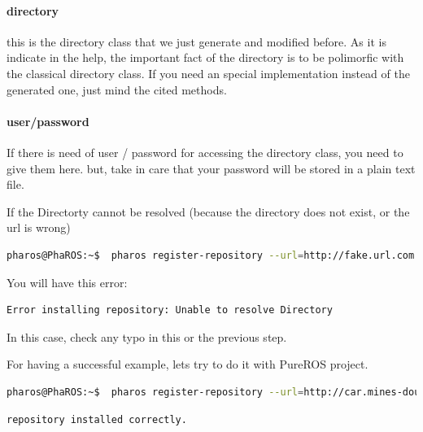 \documentclass[a4paper,10pt,twoside]{book}
\begin{document}
					\paragraph{directory} this is the directory class that we just generate and modified before.  As it is indicate in the help, the important fact of the directory is to be polimorfic with the classical directory class. If you need an special implementation instead of the generated one, just mind the cited methods.
					
					\paragraph{user/password} If there is need of user / password for accessing the directory class, you need to give them here. 
					but, take in care that your password will be stored in a plain text file. 
					
					
					
					If the Directorty cannot be resolved (because the directory does not exist, or the url is wrong) 
					
					\begin{lstlisting}[language=bash,title={ Repository registration }]
						pharos@PhaROS:~$  pharos register-repository --url=http://fake.url.com --package=Directory
					\end{lstlisting} 
					
					You will have this error: 
					
					\begin{lstlisting}[language=bash,title={ Repository registration }]
						Error installing repository: Unable to resolve Directory
					\end{lstlisting} 
					
					In this case, check any typo in this or the previous step.
					
					
					For having a successful example, lets try to do it with PureROS project. 
					
					\begin{lstlisting}[language=bash,title={ Repository registration }]
					pharos@PhaROS:~$  pharos register-repository --url=http://car.mines-douai.fr/squeaksource/Pure --package=PureROSDirectory
					\end{lstlisting} 
					\begin{lstlisting}[language=bash,title={ Repository registration }]
						repository installed correctly. 
					\end{lstlisting} 
 
\end{document}
